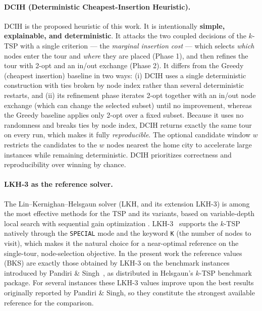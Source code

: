 \documentclass[conference]{IEEEtran}
\begin{document}
\paragraph{DCIH (Deterministic Cheapest-Insertion Heuristic).}
DCIH is the proposed heuristic of this work. It is intentionally \textbf{simple, explainable, and deterministic}. It attacks the two coupled decisions of the $k$-TSP with a single criterion --- the \emph{marginal insertion cost} --- which selects \emph{which} nodes enter the tour and \emph{where} they are placed (Phase 1), and then refines the tour with 2-opt and an in/out exchange (Phase 2). It differs from the Greedy (cheapest insertion) baseline in two ways: (i) DCIH uses a single deterministic construction with ties broken by node index rather than several deterministic restarts, and (ii) its refinement phase iterates 2-opt together with an in/out node exchange (which can change the selected subset) until no improvement, whereas the Greedy baseline applies only 2-opt over a fixed subset. Because it uses no randomness and breaks ties by node index, DCIH returns exactly the same tour on every run, which makes it fully \emph{reproducible}. The optional candidate window $w$ restricts the candidates to the $w$ nodes nearest the home city to accelerate large instances while remaining deterministic. DCIH prioritizes correctness and reproducibility over winning by chance.

\paragraph{LKH-3 as the reference solver.}
The Lin--Kernighan--Helsgaun solver (LKH, and its extension LKH-3) is among the most effective methods for the TSP and its variants, based on variable-depth local search with sequential gain optimization \cite{Helsgaun,lin1973}. LKH-3~\cite{helsgaun2017lkh3} supports the $k$-TSP natively through the \texttt{SPECIAL} mode and the keyword \texttt{K} (the number of nodes to visit), which makes it the natural choice for a near-optimal reference on the single-tour, node-selection objective. In the present work the reference values (BKS) are exactly those obtained by LKH-3 on the benchmark instances introduced by Pandiri \& Singh~\cite{pandiri2020}, as distributed in Helsgaun's $k$-TSP benchmark package. For several instances these LKH-3 values improve upon the best results originally reported by Pandiri \& Singh, so they constitute the strongest available reference for the comparison.
\end{document}
